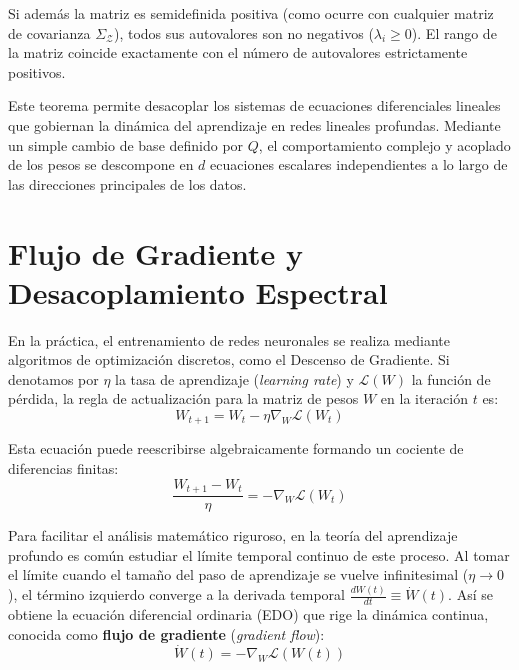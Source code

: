 Si además la matriz es semidefinida positiva (como ocurre con cualquier matriz de covarianza $\Sigma_\mathcal{Z}$), todos sus autovalores son no negativos ($\lambda_i \ge 0$). El rango de la matriz coincide exactamente con el número de autovalores estrictamente positivos.

Este teorema permite desacoplar los sistemas de ecuaciones diferenciales lineales que gobiernan la dinámica del aprendizaje en redes lineales profundas. Mediante un simple cambio de base definido por $Q$, el comportamiento complejo y acoplado de los pesos se descompone en $d$ ecuaciones escalares independientes a lo largo de las direcciones principales de los datos.

\section{Flujo de Gradiente y Desacoplamiento Espectral}
\label{sec:al_flujo_gradiente}

En la práctica, el entrenamiento de redes neuronales se realiza mediante algoritmos de optimización discretos, como el Descenso de Gradiente. Si denotamos por $\eta$ la tasa de aprendizaje (\textit{learning rate}) y $\mathcal{L}(W)$ la función de pérdida, la regla de actualización para la matriz de pesos $W$ en la iteración $t$ es:
\begin{equation}
    W_{t+1} = W_t - \eta \nabla_W \mathcal{L}(W_t)
\end{equation}

Esta ecuación puede reescribirse algebraicamente formando un cociente de diferencias finitas:
\begin{equation}
    \frac{W_{t+1} - W_t}{\eta} = - \nabla_W \mathcal{L}(W_t)
\end{equation}

Para facilitar el análisis matemático riguroso, en la teoría del aprendizaje profundo es común estudiar el límite temporal continuo de este proceso. Al tomar el límite cuando el tamaño del paso de aprendizaje se vuelve infinitesimal ($\eta \to 0$), el término izquierdo converge a la derivada temporal $\frac{dW(t)}{dt} \equiv \dot{W}(t)$. Así se obtiene la ecuación diferencial ordinaria (EDO) que rige la dinámica continua, conocida como \textbf{flujo de gradiente} (\textit{gradient flow}):
\begin{equation}
    \dot{W}(t) = -\nabla_W \mathcal{L}(W(t))
\end{equation}

